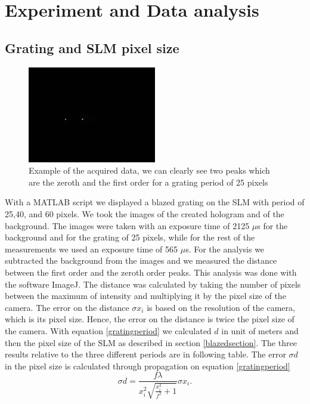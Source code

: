 \documentclass[a4paper,10pt]{article}
\begin{document}
\section{Experiment and Data analysis}
\subsection{Grating and SLM pixel size}
\begin{figure}[H]
\centering
\includegraphics[width=0.5\textwidth]{intensity0}
\caption{Example of the acquired data, we can clearly see two peaks which are the zeroth and the first order for a grating period of 25 pixels}
\end{figure}
With a MATLAB script we displayed a blazed grating on the SLM with period of 25,40, and 60 pixels. We took the images of the created hologram and of the background. The images were taken with an exposure time of 2125 $\mu$s for the background and for the grating of 25 pixels, while for the rest of the measurements we used an exposure time of 565 $\mu$s. For the analysis we subtracted the background from the images and we measured the distance between the first order and the zeroth order peaks. This analysis was done with the software ImageJ. The distance was calculated by taking the number of pixels between the maximum of intensity and multiplying it by the pixel size of the camera. The error on the distance $\sigma x_i$ is based on the resolution of the camera, which is its pixel size. Hence, the error on the distance is twice the pixel size of the camera. With equation \eqref{gratingperiod} we calculated $d$ in unit of meters and then the pixel size of the SLM as described in section \ref{blazedsection}. The three results relative to the three different periods are in following table. The error $\sigma d$ in the pixel size is calculated through propagation on equation \eqref{gratingperiod} 
\begin{equation}\sigma d = \frac{f\lambda}{x_i^2\sqrt{\frac{x_i^2}{f^2}+1}}\sigma x_i.\end{equation}
\end{document}
